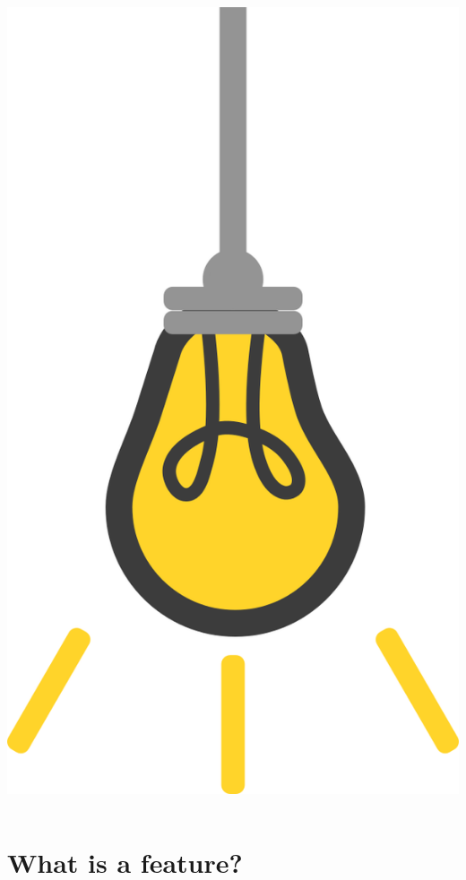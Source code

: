 \documentclass[9pt, aspectratio=169]{beamer}
\begin{document}
\begin{frame}
\begin{columns}
\begin{column}{0.2\textwidth}
            \includegraphics[angle=-30, origin=tr, width=1.5\textwidth]{lightbulb.png}
        \end{column}
    \end{columns}
\end{frame}

\section{What is a feature?}
\end{document}
